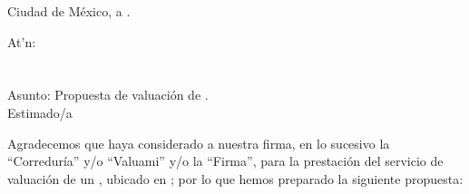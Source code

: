 \begin{flushright}
Ciudad de M\'exico, a \fechaCotizacion.
\end{flushright}
\vspace{2cm}

\begin{flushleft}
At'n: \nombreInteresado\\
\puesto\\
\nombreEmpresa\\[1cm]

Asunto: Propuesta de valuaci\'on de \tipoValuacion.\\[1cm]
Estimado/a \nombreInteresado\\
\end{flushleft}

Agradecemos que haya considerado a nuestra firma, en lo sucesivo la ``Corredur\'ia'' y/o ``Valuami'' y/o la ``Firma'', para la prestaci\'on del servicio de valuaci\'on de un \tipoValuacion, ubicado en \ubicacion; por lo que hemos preparado la siguiente propuesta:
